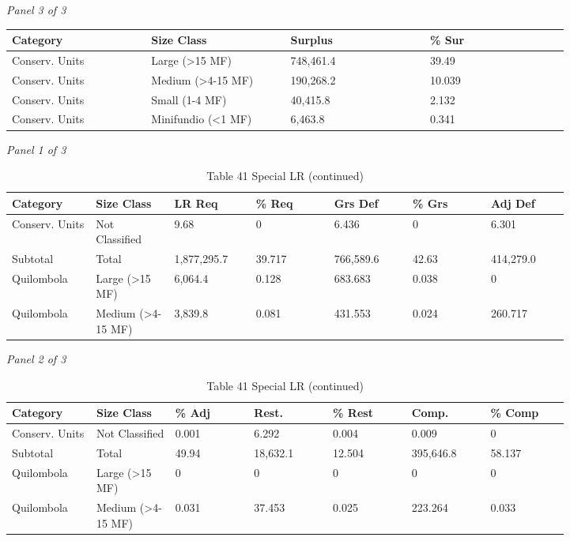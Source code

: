 \documentclass[12pt]{article}
\begin{document}
\begin{landscape}
\begin{table}[H]
\textit{Panel 3 of 3}\\[2pt]
{\fontsize{12}{14}\selectfont
\setlength{\tabcolsep}{3pt}
\renewcommand{\arraystretch}{1.08}
\begin{tabular}{p{0.205\linewidth}p{0.205\linewidth}p{0.205\linewidth}p{0.205\linewidth}}
\toprule
Category & Size Class & Surplus & \% Sur \\
\midrule
Conserv. Units & Large (>15 MF) & 748,461.4 & 39.49 \\
Conserv. Units & Medium (>4-15 MF) & 190,268.2 & 10.039 \\
Conserv. Units & Small (1-4 MF) & 40,415.8 & 2.132 \\
Conserv. Units & Minifundio (<1 MF) & 6,463.8 & 0.341 \\
\bottomrule
\end{tabular}
}
\end{table}
\begin{table}[H]
\centering
\caption{Table 41 Special LR (continued)}
\textit{Panel 1 of 3}\\[2pt]
{\fontsize{12}{14}\selectfont
\setlength{\tabcolsep}{3pt}
\renewcommand{\arraystretch}{1.08}
\begin{tabular}{p{0.117\linewidth}p{0.117\linewidth}p{0.117\linewidth}p{0.117\linewidth}p{0.117\linewidth}p{0.117\linewidth}p{0.117\linewidth}}
\toprule
Category & Size Class & LR Req & \% Req & Grs Def & \% Grs & Adj Def \\
\midrule
Conserv. Units & Not Classified & 9.68 & 0 & 6.436 & 0 & 6.301 \\
Subtotal & Total & 1,877,295.7 & 39.717 & 766,589.6 & 42.63 & 414,279.0 \\
Quilombola & Large (>15 MF) & 6,064.4 & 0.128 & 683.683 & 0.038 & 0 \\
Quilombola & Medium (>4-15 MF) & 3,839.8 & 0.081 & 431.553 & 0.024 & 260.717 \\
\bottomrule
\end{tabular}
}

\vspace{0.6em}

\textit{Panel 2 of 3}\\[2pt]
{\fontsize{12}{14}\selectfont
\setlength{\tabcolsep}{3pt}
\renewcommand{\arraystretch}{1.08}
\begin{tabular}{p{0.117\linewidth}p{0.117\linewidth}p{0.117\linewidth}p{0.117\linewidth}p{0.117\linewidth}p{0.117\linewidth}p{0.117\linewidth}}
\toprule
Category & Size Class & \% Adj & Rest. & \% Rest & Comp. & \% Comp \\
\midrule
Conserv. Units & Not Classified & 0.001 & 6.292 & 0.004 & 0.009 & 0 \\
Subtotal & Total & 49.94 & 18,632.1 & 12.504 & 395,646.8 & 58.137 \\
Quilombola & Large (>15 MF) & 0 & 0 & 0 & 0 & 0 \\
Quilombola & Medium (>4-15 MF) & 0.031 & 37.453 & 0.025 & 223.264 & 0.033 \\
\bottomrule
\end{tabular}
}


\end{table}
\end{landscape}
\end{document}
